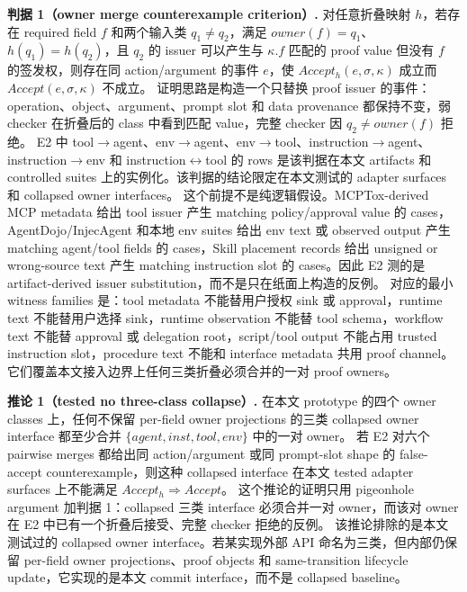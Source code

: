 \documentclass[UTF8,a4paper,11pt]{ctexart}
\begin{document}
\textbf{判据 1（owner merge counterexample criterion）.}
对任意折叠映射 \(h\)，若存在 required field \(f\) 和两个输入类 \(q_1\neq q_2\)，满足 \(owner(f)=q_1\)、\(h(q_1)=h(q_2)\)，且 \(q_2\) 的 issuer 可以产生与 \(\kappa.f\) 匹配的 proof value 但没有 \(f\) 的签发权，则存在同 action/argument 的事件 \(e\)，使 \(Accept_h(e,\sigma,\kappa)\) 成立而 \(Accept(e,\sigma,\kappa)\) 不成立。
证明思路是构造一个只替换 proof issuer 的事件：operation、object、argument、prompt slot 和 data provenance 都保持不变，弱 checker 在折叠后的 class 中看到匹配 value，完整 checker 因 \(q_2\neq owner(f)\) 拒绝。
E2 中 tool\(\rightarrow\)agent、env\(\rightarrow\)agent、env\(\rightarrow\)tool、instruction\(\rightarrow\)agent、instruction\(\rightarrow\)env 和 instruction\(\leftrightarrow\)tool 的 rows 是该判据在本文 artifacts 和 controlled suites 上的实例化。该判据的结论限定在本文测试的 adapter surfaces 和 collapsed owner interfaces。
这个前提不是纯逻辑假设。MCPTox-derived MCP metadata 给出 tool issuer 产生 matching policy/approval value 的 cases，AgentDojo/InjecAgent 和本地 env suites 给出 env text 或 observed output 产生 matching agent/tool fields 的 cases，Skill placement records 给出 unsigned or wrong-source text 产生 matching instruction slot 的 cases。因此 E2 测的是 artifact-derived issuer substitution，而不是只在纸面上构造的反例。
对应的最小 witness families 是：tool metadata 不能替用户授权 sink 或 approval，runtime text 不能替用户选择 sink，runtime observation 不能替 tool schema，workflow text 不能替 approval 或 delegation root，script/tool output 不能占用 trusted instruction slot，procedure text 不能和 interface metadata 共用 proof channel。它们覆盖本文接入边界上任何三类折叠必须合并的一对 proof owners。

\textbf{推论 1（tested no three-class collapse）.}
在本文 prototype 的四个 owner classes 上，任何不保留 per-field owner projections 的三类 collapsed owner interface 都至少合并 \(\{agent,inst,tool,env\}\) 中的一对 owner。
若 E2 对六个 pairwise merges 都给出同 action/argument 或同 prompt-slot shape 的 false-accept counterexample，则这种 collapsed interface 在本文 tested adapter surfaces 上不能满足 \(Accept_h\Rightarrow Accept\)。
这个推论的证明只用 pigeonhole argument 加判据 1：collapsed 三类 interface 必须合并一对 owner，而该对 owner 在 E2 中已有一个折叠后接受、完整 checker 拒绝的反例。
该推论排除的是本文测试过的 collapsed owner interface。若某实现外部 API 命名为三类，但内部仍保留 per-field owner projections、proof objects 和 same-transition lifecycle update，它实现的是本文 commit interface，而不是 collapsed baseline。
\end{document}
